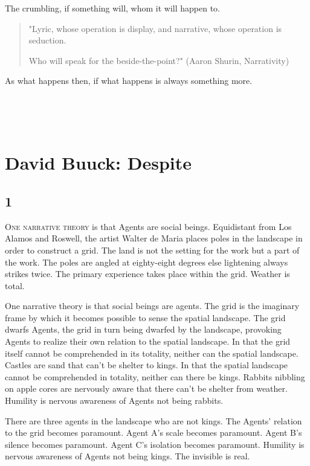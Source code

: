 \documentclass[
]{memoir}
\begin{document}
The crumbling, if something will, whom it will happen to.

\begin{quote}
"Lyric, whose operation is display, and narrative, whose operation is
seduction.

Who will speak for the beside-the-point?" (Aaron Shurin, Narrativity)
\end{quote}

As what happens then, if what happens is always something more.

~

~

\hypertarget{david-buuck-despite}{%
\chapter{David Buuck: Despite}\label{david-buuck-despite}}

\hypertarget{section-2}{%
\section*{1}\label{section-2}}

\lettrine[lines=3, findent=0em, nindent=0.1em, lhang=0]{O}{ne narrative theory}
is that Agents are social beings. Equidistant from Los Alamos and
Roswell, the artist Walter de Maria places poles in the landscape in
order to construct a grid. The land is not the setting for the work but
a part of the work. The poles are angled at eighty-eight degrees else
lightening always strikes twice. The primary experience takes place
within the grid. Weather is total.

One narrative theory is that social beings are agents. The grid is the
imaginary frame by which it becomes possible to sense the spatial
landscape. The grid dwarfs Agents, the grid in turn being dwarfed by the
landscape, provoking Agents to realize their own relation to the spatial
landscape. In that the grid itself cannot be comprehended in its
totality, neither can the spatial landscape. Castles are sand that can't
be shelter to kings. In that the spatial landscape cannot be
comprehended in totality, neither can there be kings. Rabbits nibbling
on apple cores are nervously aware that there can't be shelter from
weather. Humility is nervous awareness of Agents not being rabbits.

There are three agents in the landscape who are not kings. The Agents'
relation to the grid becomes paramount. Agent A's scale becomes
paramount. Agent B's silence becomes paramount. Agent C's isolation
becomes paramount. Humility is nervous awareness of Agents not being
kings. The invisible is real.
\end{document}
